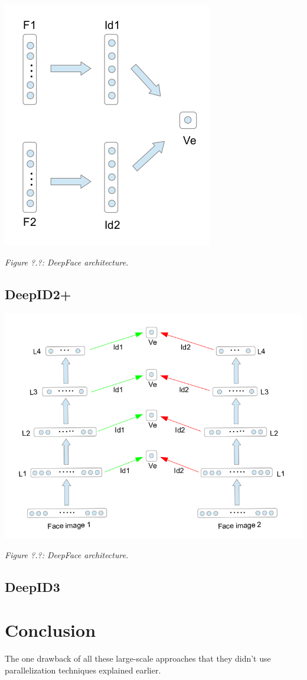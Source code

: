 \documentclass[paper=a4, fontsize=11pt]{scrartcl} %
\numberwithin{equation}{section} %
\numberwithin{figure}{section} %
\numberwithin{table}{section} %
\begin{document}
\begin{center}
\includegraphics[scale=0.5]{pictures/deepid2.png}
\par\large\textit{Figure ?.?: DeepFace architecture.}
\end{center}

\subsection{DeepID2+}

\begin{center}
\includegraphics[scale=0.5]{pictures/deepid3.png}
\par\large\textit{Figure ?.?: DeepFace architecture.}
\end{center}

\subsection{DeepID3}

\newpage

\section{Conclusion}
The one drawback of all these large-scale approaches that they didn't use parallelization techniques explained earlier.

\newpage




\end{document}
